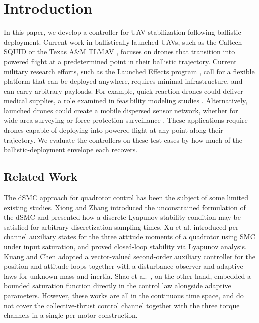 \documentclass[conf]{new-aiaa}
\begin{document}
\section{Introduction}
In this paper, we develop a controller for UAV stabilization following ballistic deployment. Current work in ballistically launched UAVs, such as the Caltech SQUID \cite{refs:Bouman2019} or the Texas A\&M TLMAV \cite{refs:Denton2025}, focuses on drones that transition into powered flight at a predetermined point in their ballistic trajectory. Current military research efforts, such as the Launched Effects program \cite{refs:Harper2025}, call for a flexible platform that can be deployed anywhere, requires minimal infrastructure, and can carry arbitrary payloads. For example, quick-reaction drones could deliver medical supplies, a role examined in feasibility modeling studies \cite{refs:Starks2024}. Alternatively, launched drones could create a mobile dispersed sensor network, whether for wide-area surveying \cite{refs:Liang2019} or force-protection surveillance \cite{refs:Michelena2025}. These applications require drones capable of deploying into powered flight at any point along their trajectory. We evaluate the controllers on these test cases by how much of the ballistic-deployment envelope each recovers.

\subsection{Related Work}
The dSMC approach for quadrotor control has been the subject of some limited existing studies. Xiong and Zhang \cite{refs:Xiong2016} introduced the unconstrained formulation of the dSMC and presented how a discrete Lyapunov stability condition may be satisfied for arbitrary discretization sampling times. Xu et al. \cite{refs:Xu2020} introduced per-channel auxiliary states for the three attitude moments of a quadrotor using SMC under input saturation, and proved closed-loop stability via Lyapunov analysis. Kuang and Chen \cite{refs:Kuang2024} adopted a vector-valued second-order auxiliary controller for the position and attitude loops together with a disturbance observer and adaptive laws for unknown mass and inertia. Shao et al.\ \cite{refs:Shao2022}, on the other hand, embedded a bounded saturation function directly in the control law alongside adaptive parameters. However, these works are all in the continuous time space, and do not cover the collective-thrust control channel together with the three torque channels in a single per-motor construction. 
\end{document}
